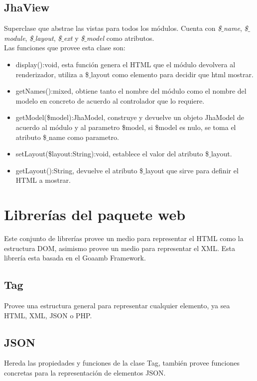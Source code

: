 \subsection{JhaView}
Superclase que abstrae las vistas para todos los m\'odulos. Cuenta con \textit{\$$\_$name}, \textit{\$$\_$module}, \textit{\$$\_$layout}, \textit{\$$\_$ext} y \textit{\$$\_$model} como atributos.\\
Las funciones que provee esta clase son:
\begin{itemize}
\item \textsf{display():void}, esta funci\'on genera el HTML que el m\'odulo devolvera al renderizador, utiliza a \$$\_$layout como elemento para decidir que html mostrar.
\item \textsf{getNames():mixed}, obtiene tanto el nombre del m\'odulo como el nombre del modelo en concreto de acuerdo al controlador que lo requiere.
\item \textsf{getModel(\$model):JhaModel}, construye y devuelve un objeto JhaModel de acuerdo al m\'odulo y al parametro \$model, si \$model es nulo, se toma el atributo \$$\_$name como parametro.
\item \textsf{setLayout(\$layout:String):void}, establece el valor del atributo \$$\_$layout.
\item \textsf{getLayout():String}, devuelve el atributo \$$\_$layout que sirve para definir el HTML a mostrar.
\end{itemize}

\section{Librer\'ias del paquete \textsf{web}}
Este conjunto de librer\'ias provee un medio para representar el HTML como la estructura DOM, asimismo provee un medio para representar el XML. Esta librer\'ia esta basada en el Goaamb Framework.

\subsection{Tag}
Provee una estructura general para representar cualquier elemento, ya sea HTML, XML, JSON o PHP.

\subsection{JSON}
Hereda las propiedades y funciones de la clase Tag, tambi\'en provee funciones concretas para la representaci\'on de elementos JSON.

